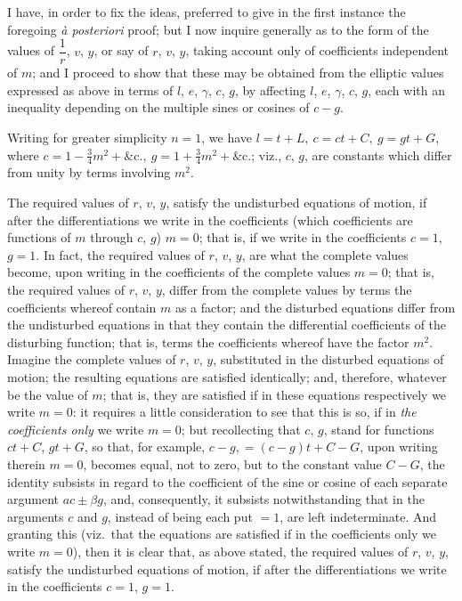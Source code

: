 \documentclass[11pt]{article}
\begin{document}
I have, in order to fix the ideas, preferred to give in the first
instance the foregoing \textit{\`a posteriori} proof; but I now
inquire generally as to the form of the values of $\dfrac{1}{r}$,
$v$, $y$, or say of $r$, $v$, $y$, taking account only of coefficients
independent of $m$; and I proceed to show that these may be obtained
from the elliptic values expressed as above in terms of $l$, $e$,
$\gamma$, $c$, $g$, by affecting $l$, $e$, $\gamma$, $c$, $g$, each
with an inequality depending on the multiple sines or cosines of
$c - g$.

Writing for greater simplicity $n = 1$, we have
$l = t + L,\ c = ct + C,\ g = gt + G$, where
$c = 1 - \tfrac{3}{4}m^{2} + \&\mathrm{c}.,\ g = 1 + \tfrac{3}{4}m^{2} + \&\mathrm{c}.$;
viz., $c$, $g$, are constants which differ from unity by terms
involving $m^{2}$.

The required values of $r$, $v$, $y$, satisfy the undisturbed
equations of motion, if after the differentiations we write in the
coefficients (which coefficients are functions of $m$ through $c$, $g$)
$m = 0$; that is, if we write in the coefficients $c = 1$, $g = 1$. In
fact, the required values of $r$, $v$, $y$, are what the complete
values become, upon writing in the coefficients of the complete values
$m = 0$; that is, the required values of $r$, $v$, $y$, differ from the
complete values by terms the coefficients whereof contain $m$ as a
factor; and the disturbed equations differ from the undisturbed
equations in that they contain the differential coefficients of the
disturbing function; that is, terms the coefficients whereof have the
factor $m^{2}$. Imagine the complete values of $r$, $v$, $y$,
substituted in the disturbed equations of motion; the resulting
equations are satisfied identically; and, therefore, whatever be the
value of $m$; that is, they are satisfied if in these equations
respectively we write $m = 0$: it requires a little consideration to
see that this is so, if in \textit{the coefficients only} we write
$m = 0$; but recollecting that $c$, $g$, stand for functions $ct + C$,
$gt + G$, so that, for example, $c - g, = (c - g)t + C - G$, upon
writing therein $m = 0$, becomes equal, not to zero, but to the
constant value $C - G$, the identity subsists in regard to the
coefficient of the sine or cosine of each separate argument
$ac \pm \beta g$, and, consequently, it subsists notwithstanding that
in the arguments $c$ and $g$, instead of being each put $= 1$, are
left indeterminate. And granting this (viz.\ that the equations are
satisfied if in the coefficients only we write $m = 0$), then it is
clear that, as above stated, the required values of $r$, $v$, $y$,
satisfy the undisturbed equations of motion, if after the
differentiations we write in the coefficients $c = 1$, $g = 1$.
\end{document}
